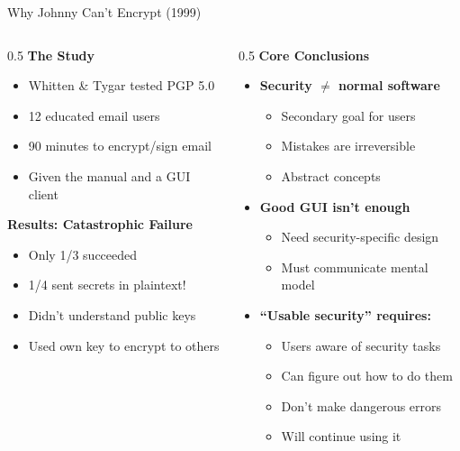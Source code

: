 \ifdefined\PRESENTATION\else\PassOptionsToClass{handout}{beamer}\fi\documentclass[aspectratio=169, lualatex]{beamer}
\begin{document}
\begin{frame}{Why Johnny Can't Encrypt (1999)}
	\begin{columns}[T]
		\begin{column}{0.5\textwidth}
			\textbf{The Study}
			\begin{itemize}
				\item Whitten \& Tygar tested PGP 5.0
				\item 12 educated email users
				\item 90 minutes to encrypt/sign email
				\item Given the manual and a GUI client
			\end{itemize}
			\textbf{Results: Catastrophic Failure}
			\begin{itemize}
				\item Only 1/3 succeeded
				\item 1/4 sent secrets in plaintext!
				\item Didn't understand public keys
				\item Used own key to encrypt to others
			\end{itemize}
		\end{column}
		\begin{column}{0.5\textwidth}
			\textbf{Core Conclusions}
			\begin{itemize}
				\item \textbf{Security $\neq$ normal software}
				      \begin{itemize}
					      \item Secondary goal for users
					      \item Mistakes are irreversible
					      \item Abstract concepts
				      \end{itemize}
				\item \textbf{Good GUI isn't enough}
				      \begin{itemize}
					      \item Need security-specific design
					      \item Must communicate mental model
				      \end{itemize}
				\item \textbf{``Usable security'' requires:}
				      \begin{itemize}
					      \item Users aware of security tasks
					      \item Can figure out how to do them
					      \item Don't make dangerous errors
					      \item Will continue using it
				      \end{itemize}
			\end{itemize}
		\end{column}
	\end{columns}
\end{frame}
\end{document}

